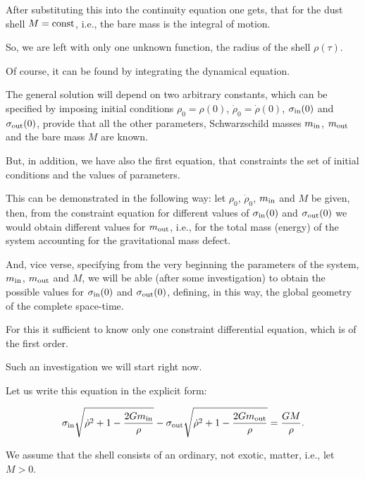After substituting this into the continuity equation one gets, that for the dust shell $M = \rm const$, i.e., the bare mass is the integral of motion. 

So, we are left with only one unknown function, the radius of the shell $\rho (\tau)$. 

Of course, it can be found by integrating the dynamical equation. 

The general solution will depend on two arbitrary constants, which can be specified by imposing initial conditions $\rho_0 = \rho (0)$, $\dot \rho_0 = \dot \rho (0)$, $\sigma_{\rm in}(0)$ and $\sigma_{\rm out}(0)$, provide that all the other parameters, Schwarzschild masses $m_{\rm in}$, $m_{\rm out}$ and the bare mass $M$ are known. 

But, in addition, we have also the first equation, that constraints the set of initial conditions and the values of parameters. 

This can be demonstrated in the following way: let $\rho_0$, $\dot \rho_0$, $m_{\rm in}$ and $M$ be given, then, from the constraint equation for different values of $\sigma_{\rm in}(0)$ and $\sigma_{\rm out}(0)$ we would obtain different values for $m_{\rm out}$, i.e., for the total mass (energy) of the system accounting for the gravitational mass defect. 

And, vice verse, specifying from the very beginning the parameters of the system, $m_{\rm in}$, $m_{\rm out}$ and $M$, we will be able (after some investigation) to obtain the possible values for $\sigma_{\rm in}(0)$ and $\sigma_{\rm out}(0)$, defining, in this way, the global geometry of the complete space-time. 

For this it sufficient to know only one constraint differential equation, which is of the first order.

Such an investigation we will start right now.



Let us write this equation in the explicit form:

\begin{equation}

\label{maineq1}

\sigma_{\rm in} \sqrt{\dot \rho^2 + 1 - \frac{2 G m_{\rm in}}{\rho}} - \sigma_{\rm out} \sqrt{\dot \rho^2 + 1 - \frac{2 G m_{\rm out}}{\rho}} = \frac{G M}{\rho} .

\end{equation}

We assume that the shell consists of an ordinary, not exotic, matter, i.e., let $M > 0$. 

